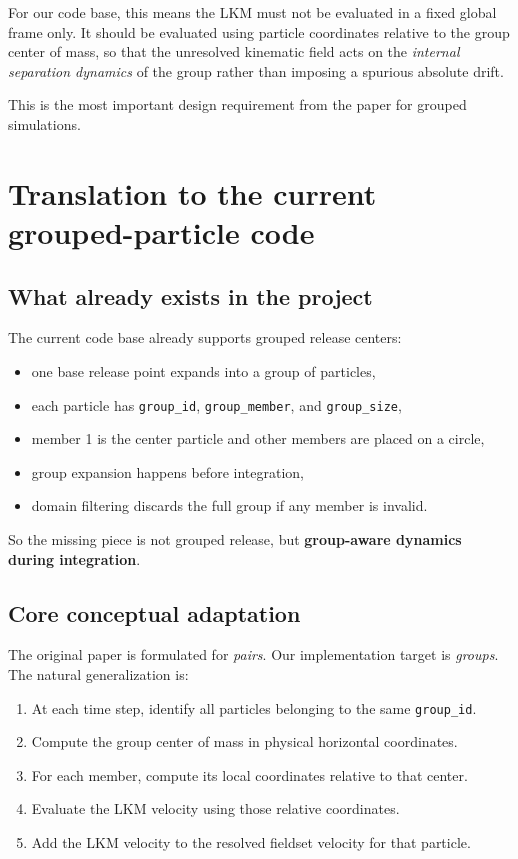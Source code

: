 \documentclass[11pt,a4paper]{article}
\begin{document}
	For our code base, this means the LKM must not be evaluated in a fixed global frame only. It should be evaluated using particle coordinates relative to the group center of mass, so that the unresolved kinematic field acts on the \emph{internal separation dynamics} of the group rather than imposing a spurious absolute drift.
	
	This is the most important design requirement from the paper for grouped simulations.
	
	\section{Translation to the current grouped-particle code}
	
	\subsection{What already exists in the project}
	
	The current code base already supports grouped release centers:
	\begin{itemize}[leftmargin=1.5em]
		\item one base release point expands into a group of particles,
		\item each particle has \texttt{group\_id}, \texttt{group\_member}, and \texttt{group\_size},
		\item member 1 is the center particle and other members are placed on a circle,
		\item group expansion happens before integration,
		\item domain filtering discards the full group if any member is invalid.
	\end{itemize}
	
	So the missing piece is not grouped release, but \textbf{group-aware dynamics during integration}.
	
	\subsection{Core conceptual adaptation}
	
	The original paper is formulated for \emph{pairs}. Our implementation target is \emph{groups}. The natural generalization is:
	\begin{enumerate}[label=\arabic*.]
		\item At each time step, identify all particles belonging to the same \texttt{group\_id}.
		\item Compute the group center of mass in physical horizontal coordinates.
		\item For each member, compute its local coordinates relative to that center.
		\item Evaluate the LKM velocity using those relative coordinates.
		\item Add the LKM velocity to the resolved fieldset velocity for that particle.
	\end{enumerate}
	
\end{document}

